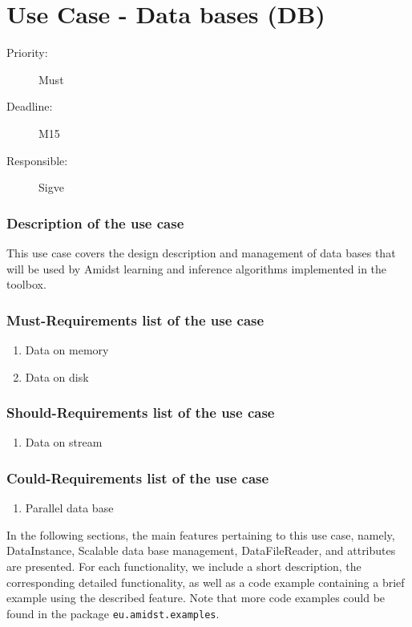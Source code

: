 \newpage
\section{Use Case - Data bases (DB)}
\label{UseCase:DB}

\begin{description}
\item[Priority:] Must
\item[Deadline:] M15
\item[Responsible:] Sigve
\end{description}

\subsubsection*{Description of the use case}

This use case covers the design description and management of data bases that will be used by Amidst learning and inference algorithms implemented in the toolbox.  

\subsubsection*{Must-Requirements list of the use case}

\begin{enumerate}
\item Data on memory
\item Data on disk
\end{enumerate}

\subsubsection*{Should-Requirements list of the use case}

\begin{enumerate}
\item Data on stream
\end{enumerate}

\subsubsection*{Could-Requirements list of the use case}

\begin{enumerate}
\item Parallel data base
\end{enumerate}

In the following sections, the main features pertaining to this use case, namely,  DataInstance, Scalable data base management, DataFileReader, and attributes are presented. For each functionality, we include a short description, the corresponding detailed functionality, as well as a code example containing a brief example using the described feature. Note that more code examples could be found in the package \texttt{eu.amidst.examples}.

